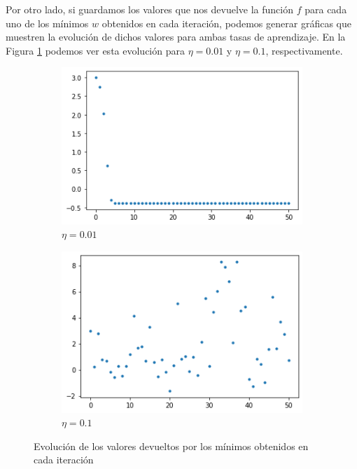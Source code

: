 \documentclass[10pt,a4paper]{article}
\begin{document}
Por otro lado, si guardamos los valores que nos devuelve la función $f$ para cada uno de los mínimos $w$ obtenidos en cada iteración, podemos generar gráficas que muestren la evolución de dichos valores para ambas tasas de aprendizaje. En la Figura \ref{fig:ej1.3_evolucion} podemos ver esta evolución para $\eta = 0.01$ y $\eta = 0.1$, respectivamente. 

\begin{figure}[h]
	\begin{subfigure}{0.5\textwidth}
		\centering
		\includegraphics[width=\textwidth]{ej1.3_evolucion_eta0.01}
		\caption{$\eta = 0.01$}
	\end{subfigure}
	\begin{subfigure}{0.5\textwidth}
		\centering
		\includegraphics[width=\textwidth]{ej1.3_evolucion_eta0.1}
		\caption{$\eta = 0.1$}
	\end{subfigure}
	\caption{Evolución de los valores devueltos por los mínimos obtenidos en cada iteración}
	\label{fig:ej1.3_evolucion}
\end{figure}
\end{document}
